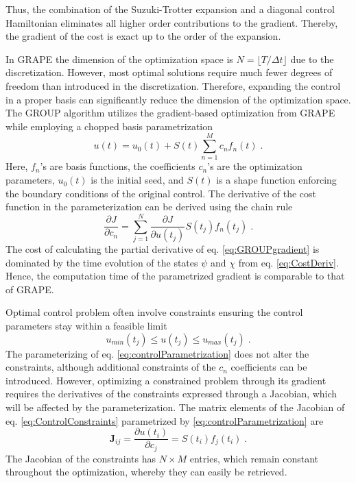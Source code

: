 \documentclass[%
 reprint,
 amsmath,amssymb,
 aps,
pra,
]{revtex4-1}
\begin{document}
Thus, the combination of the Suzuki-Trotter expansion and a diagonal control Hamiltonian eliminates all higher order contributions to the gradient. Thereby, the gradient of the cost is exact up to the order of the expansion.

In GRAPE the dimension of the optimization space is $N = \lfloor T / \Delta t \rfloor$ due to the discretization. However, most optimal solutions require much fewer degrees of freedom than introduced in the discretization. Therefore, expanding the control in a proper basis can significantly reduce the dimension of the optimization space.
The GROUP algorithm utilizes the gradient-based optimization from GRAPE while employing a chopped basis parametrization 
\begin{equation}
	u(t) = u_0 (t) + S(t) \sum_{n=1}^{M} c_n f_n (t) \; . \label{eq:controlParametrization}
\end{equation}
Here, $f_n$'s are basis functions, the coefficients $c_n$'s are the optimization parameters, $u_0 (t)$ is the initial seed, and $S(t)$ is a shape function enforcing the boundary conditions of the original control. The derivative of the cost function in the parameterization can be derived using the chain rule
\begin{equation}
	\frac{\partial J }{\partial c_n} = \sum_{j = 1}^{N} \frac{\partial J }{\partial u(t_j)} S(t_j) f_n(t_j) \; . \label{eq:GROUPgradient} 
\end{equation}
The cost of calculating the partial derivative of eq. \eqref{eq:GROUPgradient} is dominated by the time evolution of the states $\psi$ and $\chi$ from eq. \eqref{eq:CostDeriv}. Hence, the computation time of the parametrized gradient is comparable to that of GRAPE.

Optimal control problem often involve constraints ensuring the control parameters stay within a feasible limit
\begin{equation}
	 u_{min} (t_j) \leq u(t_j) \leq u_{max} (t_j) \; .
	 \label{eq:ControlConstraints}
\end{equation}
The parameterizing of eq. \eqref{eq:controlParametrization} does not alter the constraints, although additional constraints of the $c_n$ coefficients can be introduced. However, optimizing a constrained problem through its gradient requires the derivatives of the constraints expressed through a Jacobian, which will be affected by the parameterization. The matrix elements of the Jacobian of eq. \eqref{eq:ControlConstraints} parametrized by \eqref{eq:controlParametrization} are
\begin{equation}
	\boldsymbol{J}_{ij} = \frac{\partial u(t_i)}{\partial c_j} = S(t_i) f_j (t_i) \; . \label{eq:ConstraintJacobian}
\end{equation}
The Jacobian of the constraints has $N \times M$ entries, which remain constant throughout the optimization, whereby they can easily be retrieved.
  
\end{document}
